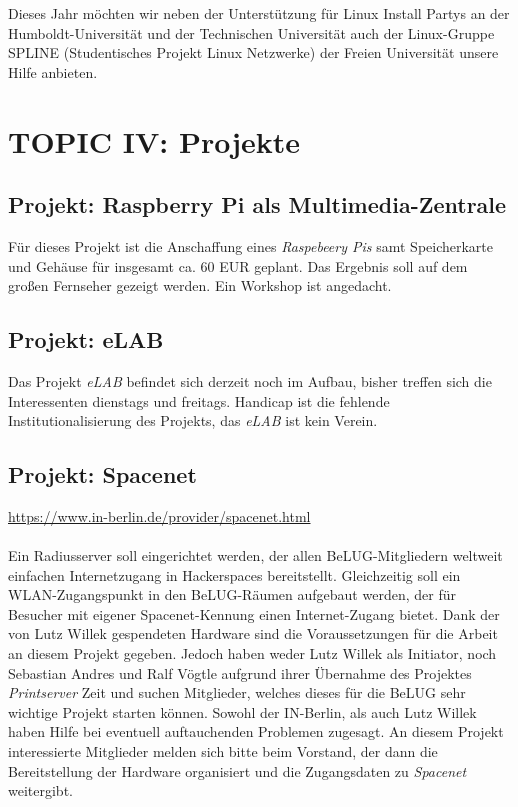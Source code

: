\documentclass[11pt,a4paper,ngerman]{article}
\newcommand{\urlwofont}[1]
{
\urlstyle{same}\url{#1}
}
\begin{document}
Dieses Jahr möchten wir neben der Unterstützung für Linux Install Partys an der 
Humboldt-Universität und der Technischen Universität auch der Linux-Gruppe 
SPLINE (Studentisches Projekt Linux Netzwerke) der Freien Universität unsere 
Hilfe anbieten.


\section{TOPIC IV: Projekte}


  \subsection{Projekt: Raspberry Pi als Multimedia-Zentrale}
  
Für dieses Projekt ist die Anschaffung eines \emph{Raspebeery Pis} samt 
Speicherkarte und Gehäuse für insgesamt ca. 60 EUR geplant. Das Ergebnis soll 
auf dem großen Fernseher gezeigt werden. Ein Workshop ist angedacht.


  \subsection{Projekt: eLAB}
  
Das Projekt \emph{eLAB} befindet sich derzeit noch im Aufbau, bisher treffen 
sich die Interessenten dienstags und freitags. Handicap ist die fehlende 
Institutionalisierung des Projekts, das \emph{eLAB} ist kein Verein.


  \subsection{Projekt: Spacenet}

\urlwofont{https://www.in-berlin.de/provider/spacenet.html}\\
\\
Ein Radiusserver soll eingerichtet werden, der allen BeLUG-Mitgliedern 
weltweit einfachen Internetzugang in Hackerspaces bereitstellt. Gleichzeitig 
soll ein WLAN-Zugangspunkt in den BeLUG-Räumen aufgebaut werden, der für 
Besucher mit eigener Spacenet-Kennung einen Internet-Zugang bietet. Dank der 
von Lutz Willek gespendeten Hardware sind die Voraussetzungen für die Arbeit an 
diesem Projekt gegeben. Jedoch haben weder Lutz Willek als Initiator, noch 
Sebastian Andres und Ralf Vögtle aufgrund ihrer Übernahme des Projektes 
\emph{Printserver} Zeit und suchen Mitglieder, welches dieses für die BeLUG sehr 
wichtige Projekt starten können. Sowohl der IN-Berlin, als auch Lutz Willek 
haben Hilfe bei eventuell auftauchenden Problemen zugesagt. An diesem Projekt 
interessierte Mitglieder melden sich bitte beim Vorstand, der dann die 
Bereitstellung der Hardware organisiert und die Zugangsdaten zu \emph{Spacenet} 
weitergibt.
\end{document}
